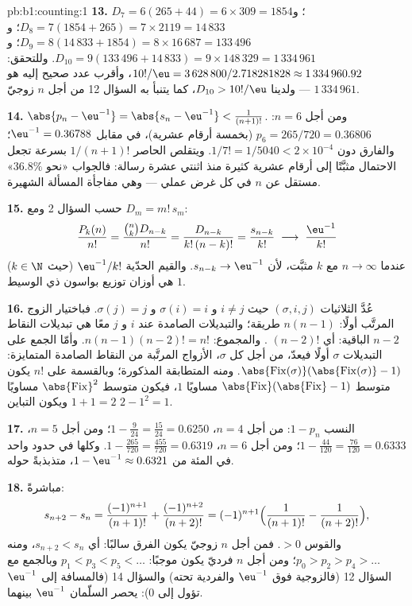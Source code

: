 \begin{solution}{pb:b1:counting:1}
\textbf{13.} $D_7 = 6(265 + 44) = 6 \times 309 = 1854$؛ و$D_8 =
7(1854 + 265) = 7 \times 2119 = 14\,833$؛ و$D_9 = 8(14\,833 + 1854)
= 8 \times 16\,687 = 133\,496$؛ و$D_{10} = 9(133\,496 + 14\,833) =
9 \times 148\,329 = 1\,334\,961$. وللتحقق: $10!/\eu = 3\,628\,800 /
2.718281828 \approx 1\,334\,960.92$، وأقرب عدد صحيح إليه هو
$1\,334\,961$ --- ولدينا $D_{10} > 10!/\eu$، كما يتنبأ به السؤال 12
من أجل $n$ زوجيّ.

\textbf{14.} $\abs{p_n - \eu^{-1}} = \abs{s_n - \eu^{-1}} <
\frac1{(n+1)!}$. ومن أجل $n = 6$: $p_6 = 265/720 = 0.36806$ (بخمسة
أرقام عشرية)، في مقابل $\eu^{-1} = 0.36788$؛ والفارق دون $1/7! =
1/5040 < 2 \times 10^{-4}$. ويتقلص الحاصر $1/(n+1)!$ بسرعة تجعل
الاحتمال مثبَّتًا إلى أرقام عشرية كثيرة منذ اثنتي عشرة رسالة:
فالجواب «نحو $36.8\%$» مستقل عن $n$ في كل غرض عملي --- وهي مفاجأة
المسألة الشهيرة.

\textbf{15.} حسب السؤال 2 ومع $D_m = m!\,s_m$:
\[
\frac{P_k(n)}{n!} = \frac{\binom nk D_{n-k}}{n!}
= \frac{D_{n-k}}{k!\,(n-k)!} = \frac{s_{n-k}}{k!}
\;\longrightarrow\; \frac{\eu^{-1}}{k!}
\]
عندما $n \to \infty$ مع $k$ مثبَّت، لأن $s_{n-k} \to \eu^{-1}$.
والقيم الحدّية $\eu^{-1}/k!$ (حيث $k \in \N$) هي أوزان
توزيع بواسون ذي الوسيط $1$.

\textbf{16.} عُدَّ الثلاثيات $(\sigma, i, j)$ حيث $i \neq j$ و
$\sigma(i) = i$ و $\sigma(j) = j$. فباختيار الزوج المرتَّب أولًا:
$n(n-1)$ طريقة؛ والتبديلات الصامدة عند $i$ و $j$ معًا هي
تبديلات النقاط $n - 2$ الباقية: أي $(n-2)!$ .
والمجموع: $n(n-1)(n-2)! = n!$. وأمّا الجمع على التبديلات $\sigma$ أولًا فيعدّ،
من أجل كل $\sigma$، الأزواج المرتَّبة من النقاط الصامدة
المتمايزة: $\abs{\mathrm{Fix}(\sigma)}(\abs{\mathrm{Fix}(\sigma)}-1)$.
ومنه المتطابقة المذكورة؛ وبالقسمة على $n!$ يكون متوسط
$\abs{\mathrm{Fix}}(\abs{\mathrm{Fix}} - 1)$ مساويًا $1$، فيكون متوسط
$\abs{\mathrm{Fix}}^2$ مساويًا $1 + 1 = 2$ ويكون التباين $2 -
1^2 = 1$.

\textbf{17.} النسب $1 - p_n$: من أجل $n = 4$، $1 - \frac
9{24} = \frac{15}{24} = 0.6250$؛ ومن أجل $n = 5$، $1 - \frac{44}{120} =
\frac{76}{120} = 0.6333$؛ ومن أجل $n = 6$، $1 - \frac{265}{720} =
\frac{455}{720} = 0.6319$. وكلها في حدود واحد في المئة من $1 - \eu^{-1}
\approx 0.6321$، متذبذبةً حوله.

\textbf{18.} مباشرةً:
\[
s_{n+2} - s_n = \frac{(-1)^{n+1}}{(n+1)!} +
\frac{(-1)^{n+2}}{(n+2)!}
= (-1)^{n+1}\Bigl(\frac1{(n+1)!} - \frac1{(n+2)!}\Bigr),
\]
والقوس $> 0$. فمن أجل $n$ زوجيّ يكون الفرق
سالبًا: أي $s_{n+2} < s_n$، ومنه $p_0 > p_2 > p_4 > \dots$؛ ومن أجل $n$
فرديّ يكون موجبًا: $p_1 < p_3 < p_5 < \dots$ وبالجمع مع
السؤال 12 (فالزوجية فوق $\eu^{-1}$ والفردية تحته) والسؤال 14
(فالمسافة إلى $\eu^{-1}$ تؤول إلى $0$): يحصر السلّمان
$\eu^{-1}$ بينهما.


\end{solution}
